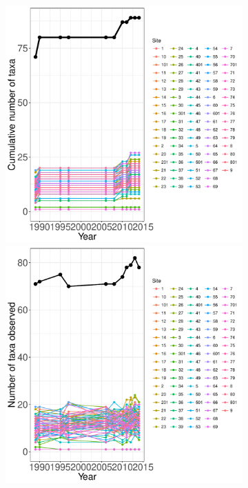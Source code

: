 \documentclass[11pt, oneside]{article}
\begin{document}
\begin{figure}[h!]
\begin{figure}[h!]
\centering
\includegraphics[scale = 0.4]{nwt-plants-hallett_species_accumulation_curve.pdf}
\includegraphics[scale = 0.4]{nwt-plants-hallett_num_taxa_over_time.pdf}

\end{figure}
\end{figure}
\end{document}
